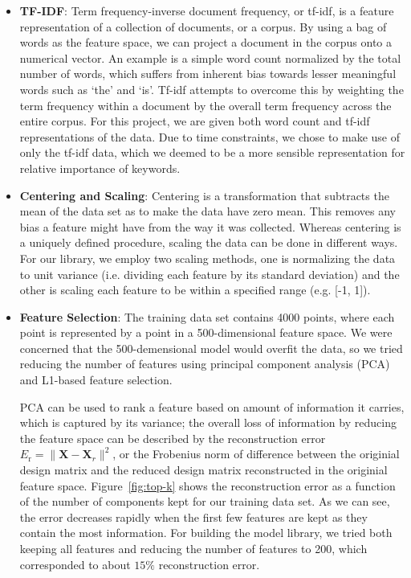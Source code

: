 \documentclass{article}
\renewcommand{\(}{\left(}
\renewcommand{\)}{\right)}
\begin{document}
  \begin{itemize}
    \item \textbf{TF-IDF}: Term frequency-inverse document frequency, or tf-idf, is a feature representation of a collection of documents, or a corpus. By using a bag of words as the feature space, we can project a document in the corpus onto a numerical vector.  An example is a simple word count normalized by the total number of words, which suffers from inherent bias towards lesser meaningful words such as `the' and `is'.  Tf-idf attempts to overcome this by weighting the term frequency within a document by the overall term frequency across the entire corpus.  For this project, we are given both word count and tf-idf representations of the data.  Due to time constraints, we chose to make use of only the tf-idf data, which we deemed to be a more sensible representation for relative importance of keywords.

    \item \textbf{Centering and Scaling}: Centering is a transformation that subtracts the mean of the data set as to make the data have zero mean.  This removes any bias a feature might have from the way it was collected. Whereas centering is a uniquely defined procedure, scaling the data can be done in different ways. For our library, we employ two scaling methods, one is normalizing the data to unit variance (i.e. dividing each feature by its standard deviation) and the other is scaling each feature to be within a specified range (e.g. [-1, 1]).     

    \item \textbf{Feature Selection}: The training data set contains 4000 points, where each point is represented by a point in a 500-dimensional feature space.  We were concerned that the 500-demensional model would overfit the data, so we tried reducing the number of features using principal component analysis (PCA) and L1-based feature selection.

PCA can be used to rank a feature based on amount of information it carries, which is captured by its variance; the overall loss of information by reducing the feature space can be described by the reconstruction error $E_{\text{r}} = \|\mathbf{X}-\mathbf{X}_r\|^2$, or the Frobenius norm of difference between the originial design matrix and the reduced design matrix reconstructed in the originial feature space. Figure~\ref{fig:top-k} shows the reconstruction error as a function of the number of components kept for our training data set.  As we can see, the error decreases rapidly when the first few features are kept as they contain the most information.  For building the model library, we tried both keeping all features and reducing the number of features to 200, which corresponded to about $15\%$ reconstruction error.   


\end{itemize}
\end{document}
